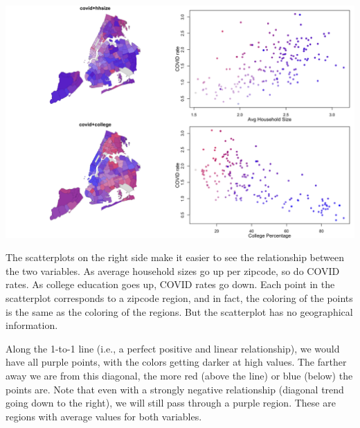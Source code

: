 \documentclass[
  openany]{book}
\newenvironment{Shaded}{\begin{snugshade}}{\end{snugshade}}
\newcommand{\AttributeTok}[1]{\textcolor[rgb]{0.77,0.63,0.00}{#1}}
\newcommand{\DecValTok}[1]{\textcolor[rgb]{0.00,0.00,0.81}{#1}}
\newcommand{\FunctionTok}[1]{\textcolor[rgb]{0.00,0.00,0.00}{#1}}
\newcommand{\NormalTok}[1]{#1}
\newcommand{\SpecialCharTok}[1]{\textcolor[rgb]{0.00,0.00,0.00}{#1}}
\newcommand{\StringTok}[1]{\textcolor[rgb]{0.31,0.60,0.02}{#1}}
\begin{document}
\begin{Shaded}
\end{Shaded}

\begin{center}\includegraphics[width=0.9\linewidth]{carpedatum_files/figure-html/unnamed-chunk-98-1} \end{center}

The scatterplots on the right side make it easier to see the relationship between the two variables. As average household sizes go up per zipcode, so do COVID rates. As college education goes up, COVID rates go down. Each point in the scatterplot corresponds to a zipcode region, and in fact, the coloring of the points is the same as the coloring of the regions. But the scatterplot has no geographical information.

Along the 1-to-1 line (i.e., a perfect positive and linear relationship), we would have all purple points, with the colors getting darker at high values. The farther away we are from this diagonal, the more red (above the line) or blue (below) the points are. Note that even with a strongly negative relationship (diagonal trend going down to the right), we will still pass through a purple region. These are regions with average values for both variables.
\end{document}
